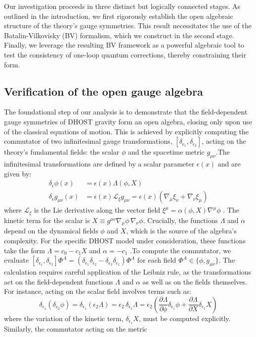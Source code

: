 \documentclass[twocolumn]{aastex631}
\begin{document}
Our investigation proceeds in three distinct but logically connected stages. As outlined in the introduction, we first rigorously establish the open algebraic structure of the theory's gauge symmetries. This result necessitates the use of the Batalin-Vilkovisky (BV) formalism, which we construct in the second stage. Finally, we leverage the resulting BV framework as a powerful algebraic tool to test the consistency of one-loop quantum corrections, thereby constraining their form.\subsection{Verification of the open gauge algebra}The foundational step of our analysis is to demonstrate that the field-dependent gauge symmetries of DHOST gravity form an open algebra, closing only upon use of the classical equations of motion. This is achieved by explicitly computing the commutator of two infinitesimal gauge transformations, $[\delta_{\epsilon_1}, \delta_{\epsilon_2}]$, acting on the theory's fundamental fields: the scalar $\phi$ and the spacetime metric $g_{\mu\nu}$.The infinitesimal transformations are defined by a scalar parameter $\epsilon(x)$ and are given by:\begin{align}\delta_\epsilon \phi(x) &= \epsilon(x) \Lambda(\phi, X) \label{eq:transf_phi} \\\delta_\epsilon g_{\mu\nu}(x) &= \epsilon(x) \mathcal{L}_{\xi} g_{\mu\nu} = \epsilon(x) (\nabla_\mu \xi_\nu + \nabla_\nu \xi_\mu) \label{eq:transf_g}\end{align}where $\mathcal{L}_{\xi}$ is the Lie derivative along the vector field $\xi^\mu = \alpha(\phi, X) \nabla^\mu \phi$  \citep{mukohyama2025bridgingdarkenergyblack}. The kinetic term for the scalar is $X \equiv g^{\mu\nu}\nabla_\mu\phi\,\nabla_\nu\phi$. Crucially, the functions $\Lambda$ and $\alpha$ depend on the dynamical fields $\phi$ and $X$, which is the source of the algebra's complexity. For the specific DHOST model under consideration, these functions take the form $\Lambda = c_0 - c_1 X$ and $\alpha = -c_1$  \citep{gao2019higherderivativescalartensortheory,takahashi2023invertibledisformaltransformationsarbitrary,michiwaki2026healthyscalartensortheoriesthirdorder}.To compute the commutator, we evaluate $[\delta_{\epsilon_1}, \delta_{\epsilon_2}] \Phi^A = (\delta_{\epsilon_1}\delta_{\epsilon_2} - \delta_{\epsilon_2}\delta_{\epsilon_1})\Phi^A$ for each field $\Phi^A \in \{\phi, g_{\mu\nu}\}$. The calculation requires careful application of the Leibniz rule, as the transformations act on the field-dependent functions $\Lambda$ and $\alpha$ as well as on the fields themselves. For instance, acting on the scalar field involves terms such as:\begin{equation}\delta_{\epsilon_1}(\delta_{\epsilon_2}\phi) = \delta_{\epsilon_1}(\epsilon_2 \Lambda) = \epsilon_2 \, \delta_{\epsilon_1}\Lambda = \epsilon_2 \left( \frac{\partial\Lambda}{\partial\phi}\delta_{\epsilon_1}\phi + \frac{\partial\Lambda}{\partial X}\delta_{\epsilon_1}X \right)\end{equation}where the variation of the kinetic term, $\delta_{\epsilon_1}X$, must be computed explicitly. Similarly, the commutator acting on the metric 
\end{document}
